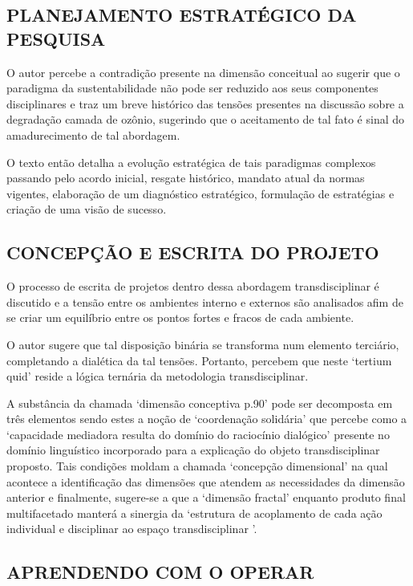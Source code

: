 \documentclass[
   article,       %
   12pt,          %
   oneside,       %
   a4paper,       %
   english,       %
   brazil,           %
   sumario=tradicional
   ]{abntex2}
\begin{document}
\subsection{PLANEJAMENTO ESTRATÉGICO DA PESQUISA}


O autor percebe a contradição presente na dimensão conceitual  ao sugerir que o paradigma da sustentabilidade não pode ser reduzido aos seus componentes disciplinares e traz um breve histórico das tensões presentes na discussão sobre a degradação camada de ozônio, sugerindo que o aceitamento de tal fato é sinal do amadurecimento de tal abordagem.

O texto então detalha a evolução estratégica de tais paradigmas complexos passando pelo acordo inicial, resgate histórico, mandato atual da normas vigentes, elaboração de um diagnóstico estratégico, formulação de estratégias e criação de uma visão de sucesso.


\subsection{CONCEPÇÃO E ESCRITA DO PROJETO}


O processo de escrita de projetos dentro dessa abordagem transdisciplinar é discutido e a tensão entre os ambientes interno e externos são analisados afim de se criar um equilíbrio entre os pontos fortes e fracos de cada ambiente. 

O autor sugere que tal disposição binária se transforma num elemento terciário, completando a dialética da tal tensões. Portanto, percebem que neste ‘tertium quid’ reside a lógica ternária da metodologia transdisciplinar.

A substância da chamada ‘dimensão conceptiva p.90’ pode ser decomposta em três elementos sendo estes a noção de ‘coordenação solidária’ que percebe como a ‘capacidade mediadora resulta do domínio do raciocínio dialógico’ presente no domínio linguístico incorporado para a explicação do objeto transdisciplinar proposto. Tais condições moldam a chamada ‘concepção dimensional’ na qual acontece a identificação das dimensões que atendem as necessidades da dimensão anterior e finalmente, sugere-se a que a ‘dimensão fractal’ enquanto produto final multifacetado manterá a sinergia da ‘estrutura
de acoplamento de cada ação individual e disciplinar ao espaço transdisciplinar \cite[p. 90]{Paradigma_Transdisciplinar_Metodologica}’.


\subsection{APRENDENDO COM O OPERAR}
\end{document}
